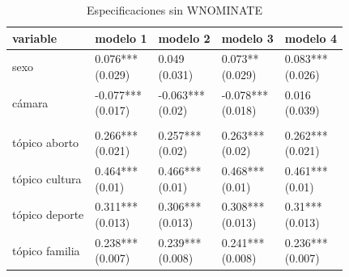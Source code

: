 \documentclass[
  12pt,
]{article}
\begin{document}
\begin{table}[H]

\caption{\label{tab:imprimir_regresion_full}Especificaciones sin WNOMINATE}
\centering
\fontsize{10}{12}\selectfont
\begin{threeparttable}
\begin{tabular}[t]{lllll}
\toprule
variable & modelo 1 & modelo 2 & modelo 3 & modelo 4\\
\midrule
sexo & \makecell[l]{0.076***\\ (0.029)} & \makecell[l]{0.049\\ (0.031)} & \makecell[l]{0.073**\\ (0.029)} & \makecell[l]{0.083***\\ (0.026)}\\
cámara & \makecell[l]{-0.077***\\ (0.017)} & \makecell[l]{-0.063***\\ (0.02)} & \makecell[l]{-0.078***\\ (0.018)} & \makecell[l]{0.016\\ (0.039)}\\
\addlinespace[0.3em]
\multicolumn{5}{l}{\textbf{Tópicos}}\\
\hspace{1em}tópico aborto & \makecell[l]{0.266***\\ (0.021)} & \makecell[l]{0.257***\\ (0.02)} & \makecell[l]{0.263***\\ (0.02)} & \makecell[l]{0.262***\\ (0.021)}\\
\hspace{1em}tópico cultura & \makecell[l]{0.464***\\ (0.01)} & \makecell[l]{0.466***\\ (0.01)} & \makecell[l]{0.468***\\ (0.01)} & \makecell[l]{0.461***\\ (0.01)}\\
\hspace{1em}tópico deporte & \makecell[l]{0.311***\\ (0.013)} & \makecell[l]{0.306***\\ (0.013)} & \makecell[l]{0.308***\\ (0.013)} & \makecell[l]{0.31***\\ (0.013)}\\
\hspace{1em}tópico familia & \makecell[l]{0.238***\\ (0.007)} & \makecell[l]{0.239***\\ (0.008)} & \makecell[l]{0.241***\\ (0.008)} & \makecell[l]{0.236***\\ (0.007)}\\

\end{tabular}
\end{threeparttable}
\end{table}
\end{document}
